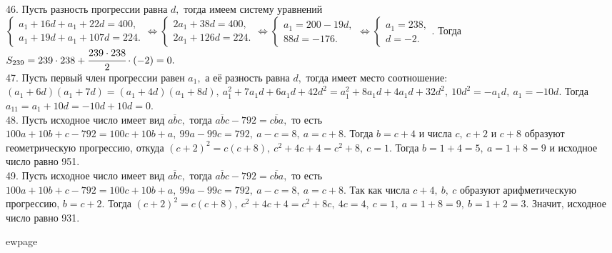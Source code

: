 46. Пусть разность прогрессии равна $d,$ тогда имеем систему уравнений\\ $\begin{cases} a_1+16d+a_1+22d=400,\\a_1+19d+a_1+107d=224.\end{cases}\Leftrightarrow
\begin{cases} 2a_1+38d=400,\\2a_1+126d=224.\end{cases}\Leftrightarrow
\begin{cases} a_1=200-19d,\\88d=-176.\end{cases}\Leftrightarrow
\begin{cases} a_1=238,\\ d=-2.\end{cases}.$ Тогда $S_{239}=239\cdot238+\cfrac{239\cdot238}{2}\cdot(-2)=0.$\\
47. Пусть первый член прогрессии равен $a_1,$ а её разность равна $d,$ тогда имеет место соотношение:
$(a_1+6d)(a_1+7d)=(a_1+4d)(a_1+8d),\ a_1^2+7a_1d+6a_1d+42d^2=a_1^2+8a_1d+4a_1d+32d^2,\ 10d^2=-a_1d,\ a_1=-10d.$ Тогда $a_{11}=a_1+10d=-10d+10d=0.$\\
48. Пусть исходное число имеет вид $\overline{abc},$ тогда
$\overline{abc}-792=\overline{cba},$ то есть
$100a+10b+c-792=100c+10b+a,\ 99a-99c=792,\ a-c=8,\ a=c+8.$ Тогда $b=c+4$ и числа $c,\ c+2$ и $c+8$ образуют геометрическую прогрессию, откуда $(c+2)^2=c(c+8),\ c^2+4c+4=c^2+8,\ c=1.$ Тогда $b=1+4=5,\ a=1+8=9$ и исходное число равно 951.\\
49. Пусть исходное число имеет вид $\overline{abc},$ тогда
$\overline{abc}-792=\overline{cba},$ то есть
$100a+10b+c-792=100c+10b+a,\ 99a-99c=792,\ a-c=8,\ a=c+8.$ Так как числа $c+4,\ b,\ c$ образуют арифметическую прогрессию, $b=c+2.$ Тогда $(c+2)^2=c(c+8),\ c^2+4c+4=c^2+8c,\ 4c=4,\ c=1,\ a=1+8=9,\ b=1+2=3.$ Значит, исходное число равно 931.

ewpage
